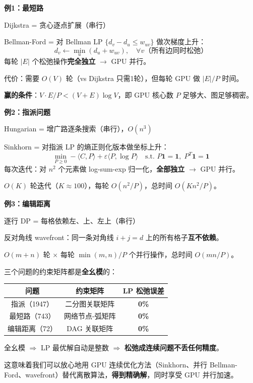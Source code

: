 \documentclass[12pt, a4paper]{ctexart}
\begin{document}
\begin{blackboard}[LP 视角：串行算法的并行替代]

\textbf{例1：最短路}

Dijkstra = 贪心逐点扩展（串行）

Bellman-Ford = 对 Bellman LP $\{d_v - d_u \leq w_{uv}\}$ 做次梯度上升：
\[
d_v \leftarrow \min_u (d_u + w_{uv}), \quad \forall v \text{（所有边同时松弛）}
\]
每轮 $|E|$ 个松弛操作\textbf{完全独立} $\to$ GPU 并行。

代价：需要 $O(V)$ 轮（vs Dijkstra 只需1轮），但每轮 GPU 做 $|E|/P$ 时间。

\textbf{赢的条件}：$V \cdot E / P < (V+E)\log V$，即 GPU 核心数 $P$ 足够大、图足够稠密。

\end{blackboard}

\begin{blackboard}[LP 视角：串行算法的并行替代（续）]

\textbf{例2：指派问题}

Hungarian = 增广路逐条搜索（串行），$O(n^3)$

Sinkhorn = 对指派 LP 的熵正则化版本做坐标上升：
\[
\min_{P \geq 0} -\langle C, P \rangle + \varepsilon \langle P, \log P \rangle \quad \text{s.t. } P\mathbf{1} = \mathbf{1},\; P^T\mathbf{1} = \mathbf{1}
\]
每次迭代：对 $n^2$ 个元素做 log-sum-exp 归一化，\textbf{全部独立} $\to$ GPU 并行。

$O(K)$ 轮迭代（$K \approx 100$），每轮 $O(n^2/P)$，总时间 $O(Kn^2/P)$。

\textbf{例3：编辑距离}

逐行 DP = 每格依赖左、上、左上（串行）

反对角线 wavefront：同一条对角线 $i+j=d$ 上的所有格子\textbf{互不依赖}。

$O(m+n)$ 轮 $\times$ 每轮 $\min(m,n)/P$ 个并行操作，总时间 $O(mn/P)$。

\end{blackboard}

\begin{blackboard}

三个问题的约束矩阵都是\textbf{全幺模}的：

\begin{center}
\begin{tabular}{c|c|c}
问题 & 约束矩阵 & LP 松弛误差 \\
\hline
指派（1947） & 二分图关联矩阵 & \textbf{0\%} \\
最短路（743） & 网络节点-弧矩阵 & \textbf{0\%} \\
编辑距离（72） & DAG 关联矩阵 & \textbf{0\%}
\end{tabular}
\end{center}

全幺模 $\Rightarrow$ LP 最优解自动是整数 $\Rightarrow$ \textbf{松弛成连续问题不丢任何精度}。

这意味着我们可以放心地用 GPU 连续优化方法（Sinkhorn、并行 Bellman-Ford、wavefront）替代离散算法，\textbf{得到精确解}，同时享受 GPU 并行加速。

\end{blackboard}
\end{document}
